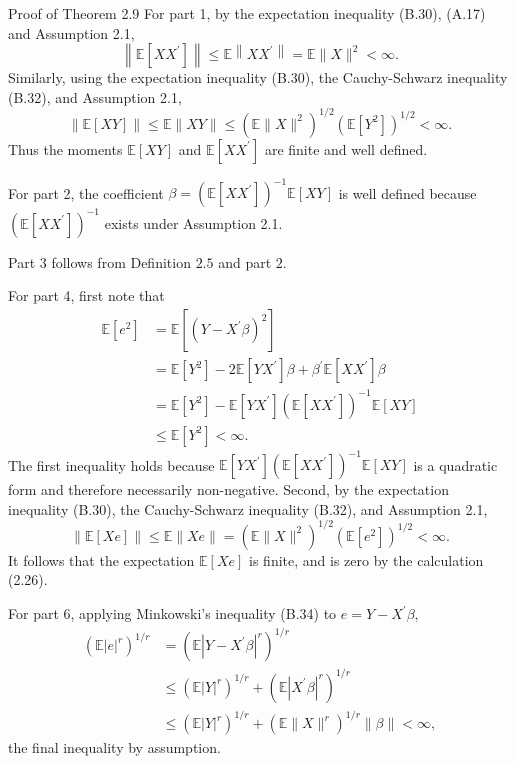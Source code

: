 \documentclass[10pt]{article}
\begin{document}
Proof of Theorem 2.9 For part 1, by the expectation inequality (B.30), (A.17) and Assumption 2.1,
$$
\left\|\mathbb{E}\left[X X^{\prime}\right]\right\| \leq \mathbb{E}\left\|X X^{\prime}\right\|=\mathbb{E}\|X\|^{2}<\infty .
$$
Similarly, using the expectation inequality (B.30), the Cauchy-Schwarz inequality (B.32), and Assumption 2.1,
$$
\|\mathbb{E}[X Y]\| \leq \mathbb{E}\|X Y\| \leq\left(\mathbb{E}\|X\|^{2}\right)^{1 / 2}\left(\mathbb{E}\left[Y^{2}\right]\right)^{1 / 2}<\infty .
$$
Thus the moments $\mathbb{E}[X Y]$ and $\mathbb{E}\left[X X^{\prime}\right]$ are finite and well defined.

For part 2, the coefficient $\beta=\left(\mathbb{E}\left[X X^{\prime}\right]\right)^{-1} \mathbb{E}[X Y]$ is well defined because $\left(\mathbb{E}\left[X X^{\prime}\right]\right)^{-1}$ exists under Assumption 2.1.

Part 3 follows from Definition $2.5$ and part $2 .$

For part 4, first note that
$$
\begin{aligned}
\mathbb{E}\left[e^{2}\right] &=\mathbb{E}\left[\left(Y-X^{\prime} \beta\right)^{2}\right] \\
&=\mathbb{E}\left[Y^{2}\right]-2 \mathbb{E}\left[Y X^{\prime}\right] \beta+\beta^{\prime} \mathbb{E}\left[X X^{\prime}\right] \beta \\
&=\mathbb{E}\left[Y^{2}\right]-\mathbb{E}\left[Y X^{\prime}\right]\left(\mathbb{E}\left[X X^{\prime}\right]\right)^{-1} \mathbb{E}[X Y] \\
& \leq \mathbb{E}\left[Y^{2}\right]<\infty .
\end{aligned}
$$
The first inequality holds because $\mathbb{E}\left[Y X^{\prime}\right]\left(\mathbb{E}\left[X X^{\prime}\right]\right)^{-1} \mathbb{E}[X Y]$ is a quadratic form and therefore necessarily non-negative. Second, by the expectation inequality (B.30), the Cauchy-Schwarz inequality (B.32), and Assumption 2.1,
$$
\|\mathbb{E}[X e]\| \leq \mathbb{E}\|X e\|=\left(\mathbb{E}\|X\|^{2}\right)^{1 / 2}\left(\mathbb{E}\left[e^{2}\right]\right)^{1 / 2}<\infty .
$$
It follows that the expectation $\mathbb{E}[X e]$ is finite, and is zero by the calculation (2.26).

For part 6, applying Minkowski's inequality (B.34) to $e=Y-X^{\prime} \beta$,
$$
\begin{aligned}
\left(\mathbb{E}|e|^{r}\right)^{1 / r} &=\left(\mathbb{E}\left|Y-X^{\prime} \beta\right|^{r}\right)^{1 / r} \\
& \leq\left(\mathbb{E}|Y|^{r}\right)^{1 / r}+\left(\mathbb{E}\left|X^{\prime} \beta\right|^{r}\right)^{1 / r} \\
& \leq\left(\mathbb{E}|Y|^{r}\right)^{1 / r}+\left(\mathbb{E}\|X\|^{r}\right)^{1 / r}\|\beta\|<\infty,
\end{aligned}
$$
the final inequality by assumption.
\end{document}
